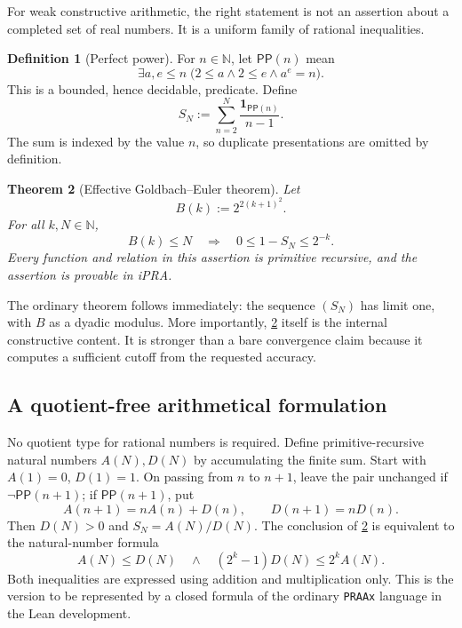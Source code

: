 \documentclass[11pt]{article}
\newtheorem{theorem}{Theorem}[section]
\theoremstyle{definition}
\newtheorem{definition}[theorem]{Definition}
\newcommand{\N}{\mathbb N}
\newcommand{\PP}{\mathsf{PP}}
\newcommand{\one}{\mathbf 1}
\begin{document}
For weak constructive arithmetic, the right statement is not an assertion
about a completed set of real numbers.  It is a uniform family of rational
inequalities.

\begin{definition}[Perfect power]\label{def:pp}
For $n\in\N$, let $\PP(n)$ mean
\[
  \exists a,e\le n\;
  \bigl(2\le a\wedge 2\le e\wedge a^e=n\bigr).
\]
This is a bounded, hence decidable, predicate.  Define
\[
  S_N:=\sum_{n=2}^{N}\frac{\one_{\PP(n)}}{n-1}.
\]
The sum is indexed by the value $n$, so duplicate presentations are omitted by
definition.
\end{definition}

\begin{theorem}[Effective Goldbach--Euler theorem]\label{thm:effective}
Let
\[
  B(k):=2^{2(k+1)^2}.
\]
For all $k,N\in\N$,
\[
  B(k)\le N
  \quad\Longrightarrow\quad
  0\le 1-S_N\le 2^{-k}.
\]
Every function and relation in this assertion is primitive recursive, and the
assertion is provable in iPRA.
\end{theorem}

The ordinary theorem follows immediately: the sequence $(S_N)$ has limit one,
with $B$ as a dyadic modulus.  More importantly, \cref{thm:effective} itself is
the internal constructive content.  It is stronger than a bare convergence
claim because it computes a sufficient cutoff from the requested accuracy.

\subsection{A quotient-free arithmetical formulation}

No quotient type for rational numbers is required.  Define primitive-recursive
natural numbers $A(N),D(N)$ by accumulating the finite sum.  Start with
$A(1)=0$, $D(1)=1$.  On passing from $n$ to $n+1$, leave the pair unchanged if
$\neg\PP(n+1)$; if $\PP(n+1)$, put
\[
  A(n+1)=nA(n)+D(n),\qquad D(n+1)=nD(n).
\]
Then $D(N)>0$ and $S_N=A(N)/D(N)$.  The conclusion of
\cref{thm:effective} is equivalent to the natural-number formula
\begin{equation}\label{eq:natural-formula}
  A(N)\le D(N)
  \quad\wedge\quad
  (2^k-1)D(N)\le 2^k A(N).
\end{equation}
Both inequalities are expressed using addition and multiplication only.  This
is the version to be represented by a closed formula of the ordinary
\texttt{PRAAx} language in the Lean development.
\end{document}
